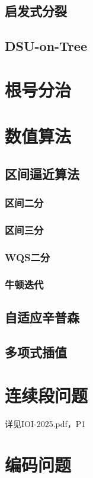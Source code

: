 \documentclass[12pt,a4paper]{article}
\begin{document}
\subsection{启发式分裂}
\subsection{DSU-on-Tree}

\newpage
\section{根号分治}

\newpage
\section{数值算法}
\subsection{区间逼近算法}
\subsubsection{区间二分}
\subsubsection{区间三分}
\subsubsection{WQS二分}
\subsubsection{牛顿迭代}
\subsection{自适应辛普森}
\subsection{多项式插值} %

\newpage
\section{连续段问题}
详见IOI-2025.pdf，P1

\newpage
\section{编码问题} %
\end{document}

